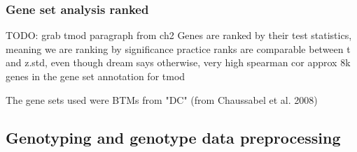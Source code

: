 \begin{outline}
\subsubsection{Gene set analysis ranked}

\1 TODO: grab tmod paragraph from ch2
    \2 Genes are ranked by their test statistics, meaning we are ranking by significance
        \3 practice ranks are comparable between t and z.std, even though dream says otherwise, very high spearman cor
    \2 approx 8k genes in the gene set annotation for tmod


The gene sets used were \glspl{BTM} from\autocite{li2013MolecularSignaturesAntibody}
"DC" (from Chaussabel et al. 2008)

\subsection{Genotyping and genotype data preprocessing}

%
%
%
%


\end{outline}
